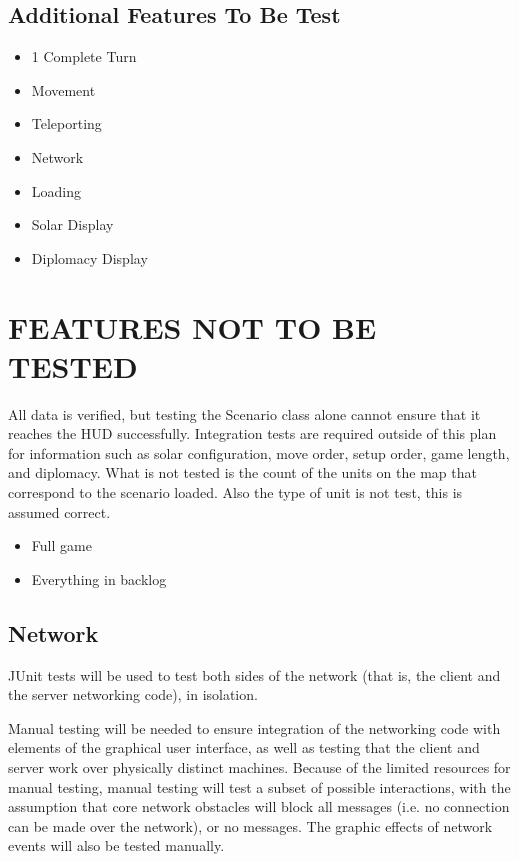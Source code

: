 {\color{black}
\subsection {Additional Features To Be Test}
\begin{itemize}
\item 1 Complete Turn
\item Movement
\item Teleporting
\item Network 
\item Loading
\item Solar Display
\item Diplomacy Display
\end{itemize}
}

\section[FEATURES NOT TO BE TESTED]{\bfseries\color{black}
	 FEATURES NOT TO BE TESTED}
{\color{black}
All data is verified, but testing the Scenario class alone cannot ensure 
that it reaches the HUD successfully. Integration tests are required outside 
of this plan for information such as solar configuration, move order, setup order, 
game length, and diplomacy.
\newline
\newline
What is not tested is the count of the units on the map that correspond to the scenario loaded. Also the type of unit is not test, this is assumed correct. 
\begin{itemize}
\item Full game
\item Everything in backlog
\end{itemize}


\subsection{Network}
JUnit tests will be used to test both sides of the network (that is,
the client and the server networking code), in isolation.

Manual testing will be needed to ensure integration of the networking
code with elements of the graphical user interface, as well as testing
that the client and server work over physically distinct machines.
Because of the limited resources for manual testing, manual testing
will test a subset of possible interactions, with the assumption that
core network obstacles will block all messages (i.e. no connection can
be made over the network), or no messages. The graphic effects of
network events will also be tested manually.
}

